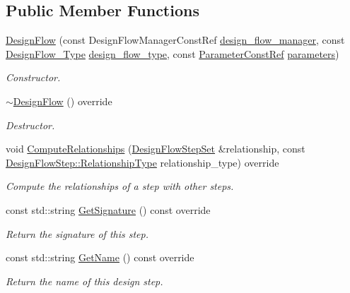 \subsection*{Public Member Functions}
\begin{DoxyCompactItemize}
\item 
\hyperlink{classDesignFlow_a4853245cdd1b2b0927fb582aa74c7b6d}{Design\+Flow} (const Design\+Flow\+Manager\+Const\+Ref \hyperlink{classDesignFlowStep_ab770677ddf087613add30024e16a5554}{design\+\_\+flow\+\_\+manager}, const \hyperlink{design__flow_8hpp_a0701ad2cbf08dc97b38caee3bbbff0c0}{Design\+Flow\+\_\+\+Type} \hyperlink{classDesignFlow_a5774fa7fbbd7935123f6705578fe50b0}{design\+\_\+flow\+\_\+type}, const \hyperlink{Parameter_8hpp_a37841774a6fcb479b597fdf8955eb4ea}{Parameter\+Const\+Ref} \hyperlink{classDesignFlowStep_a802eaafe8013df706370679d1a436949}{parameters})
\begin{DoxyCompactList}\small\item\em Constructor. \end{DoxyCompactList}\item 
\hyperlink{classDesignFlow_a9b07c7f11fddacad59852639d5d52221}{$\sim$\+Design\+Flow} () override
\begin{DoxyCompactList}\small\item\em Destructor. \end{DoxyCompactList}\item 
void \hyperlink{classDesignFlow_acdb609fb0873cfd4cb342157d4972d01}{Compute\+Relationships} (\hyperlink{classDesignFlowStepSet}{Design\+Flow\+Step\+Set} \&relationship, const \hyperlink{classDesignFlowStep_a723a3baf19ff2ceb77bc13e099d0b1b7}{Design\+Flow\+Step\+::\+Relationship\+Type} relationship\+\_\+type) override
\begin{DoxyCompactList}\small\item\em Compute the relationships of a step with other steps. \end{DoxyCompactList}\item 
const std\+::string \hyperlink{classDesignFlow_a0cfc751e3c286071ffb473e1165e1f46}{Get\+Signature} () const override
\begin{DoxyCompactList}\small\item\em Return the signature of this step. \end{DoxyCompactList}\item 
const std\+::string \hyperlink{classDesignFlow_aa8b86491bfa371d09a22f863df1c5be8}{Get\+Name} () const override
\begin{DoxyCompactList}\small\item\em Return the name of this design step. \end{DoxyCompactList}\item 

\end{DoxyCompactItemize}
